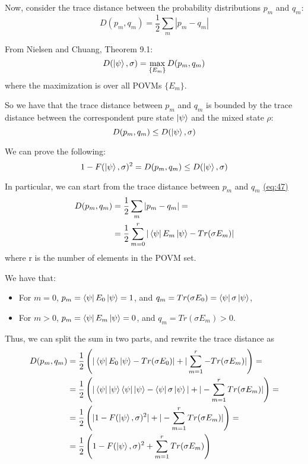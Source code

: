 \documentclass{masterthesis}
\begin{document}
Now, consider the trace distance between the probability distributions $p_m$ and $q_m$:
\begin{equation}\label{eq:trace-dist}
    D(p_m, q_m) = \frac{1}{2} \sum_{m} |p_m - q_m|
\end{equation}

From Nielsen and Chuang, Theorem 9.1:
\begin{equation}
    D(\ket{\psi}, \sigma) = \max_{\{E_m\}} D(p_m, q_m)
\end{equation}
where the maximization is over all POVMs $\{E_m\}$.

So we have that the trace distance between $p_m$ and $q_m$ is bounded by the trace distance between the correspondent pure state $\ket{\psi}$ and the mixed state $\rho$:
\begin{equation}
    D(p_m, q_m) \leq D(\ket{\psi}, \sigma)
\end{equation}

We can prove the following:
\begin{equation}
    1 - F(\ket{\psi}, \sigma)^2 = D(p_m, q_m) \leq D(\ket{\psi}, \sigma)
\end{equation}

In particular, we can start from the trace distance between $p_m$ and $q_m$ \hyperref[eq:trace-dist]{(eq:47)}
\begin{align}
    D(p_m, q_m) &= \frac{1}{2} \sum_{m} |p_m - q_m| = \\
    &= \frac{1}{2} \sum_{m=0}^{r} |\bra{\psi}E_m\ket{\psi} - Tr(\sigma E_m)|
\end{align}
where r is the number of elements in the POVM set.

We have that:
\begin{itemize}
    \item For $m=0$, $p_m=\bra{\psi}E_0\ket{\psi} = 1$, and $q_m = Tr(\sigma E_0) = \bra{\psi} \sigma \ket{\psi}$,
    \item For $m>0$, $p_m=\bra{\psi}E_m\ket{\psi} = 0$, and $q_m=Tr(\sigma E_m) > 0$.
\end{itemize}

Thus, we can split the sum in two parts, and rewrite the trace distance as
\begin{align}
    D(p_m, q_m) &= \frac{1}{2} \left(|\bra{\psi}E_0\ket{\psi} - Tr(\sigma E_0)| + | \sum_{m=1}^{r} - Tr(\sigma E_m)|\right) = \\
    &= \frac{1}{2} \left(|\bra{\psi}\ket{\psi}\bra{\psi}\ket{\psi} - \bra{\psi} \sigma \ket{\psi} | + | - \sum_{m=1}^{r} Tr(\sigma E_m)|\right) = \\
    &= \frac{1}{2} \left(|1 - F(\ket{\psi}, \sigma)^2 | + | - \sum_{m=1}^{r} Tr(\sigma E_m)|\right) = \\
    &= \frac{1}{2} \left(1 - F(\ket{\psi}, \sigma)^2 + \sum_{m=1}^{r} Tr(\sigma E_m) \right)
\end{align}
\end{document}
